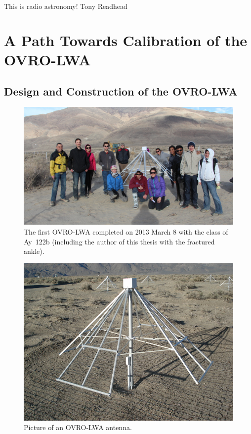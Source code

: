 \cleartoevenpage

\myepigraph
{This is radio astronomy!}
{Tony Readhead}

\chapter{A Path Towards Calibration of the OVRO-LWA}
\label{chapter2}

\begin{bibunit}

\section{Design and Construction of the OVRO-LWA}

\begin{figure}
    \centering
    \includegraphics[width=\textwidth]{figures/chapter2/first-antenna}
    \caption{
        The first OVRO-LWA completed on 2013 March 8 with the class of Ay~122b (including the author
        of this thesis with the fractured ankle).
    }
    \label{fig:ovro-first-antenna}
\end{figure}

\begin{figure}
    \centering
    \includegraphics[width=\textwidth]{figures/chapter2/lwa-antenna}
    \caption{
        Picture of an OVRO-LWA antenna.
    }
    \label{fig:ovro-lwa-pictures}
\end{figure}


\end{bibunit}
